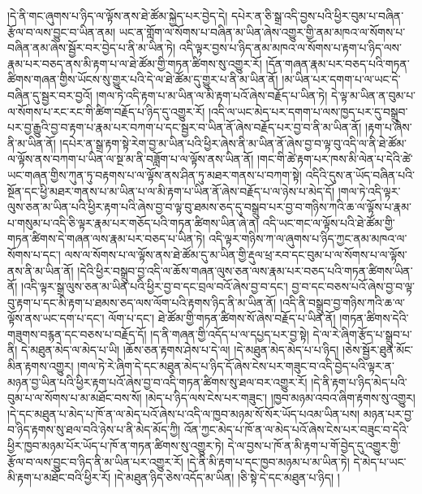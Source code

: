 །དེ་ནི་གང་ཞུགས་པ་ཉིད་ལ་ལྟོས་ནས་ཐེ་ཚོམ་སྐྱེད་པར་བྱེད་དེ། དཔེར་ན་ཅི་སྒྲ་འདི་བྱས་པའི་ཕྱིར་བུམ་པ་བཞིན་རྩོལ་བ་ལས་བྱུང་བ་ཡིན་ནམ། ཡང་ན་གློག་ལ་སོགས་པ་བཞིན་མ་ཡིན་ཞེས་འགྱུར་གྱི་ནམ་མཁའ་ལ་སོགས་པ་བཞིན་ནམ་ཞེས་སྦྱོར་བར་བྱེད་པ་ནི་མ་ཡིན་ཏེ། འདི་ལྟར་བྱས་པ་ཉིད་ནམ་མཁའ་ལ་སོགས་པ་རྟག་པ་ཉིད་ལས་རྣམ་པར་བཅད་ནས་མི་རྟག་པ་ལ་ཐེ་ཚོམ་གྱི་གཏན་ཚིགས་སུ་འགྱུར་རོ། །དོན་གཞན་རྣམ་པར་བཅད་པའི་གཏན་ཚིགས་གཞན་གྱིས་ཡོངས་སུ་གྱུར་པའི་དེ་ལ་ཐེ་ཚོམ་དུ་གྱུར་པ་ནི་མ་ཡིན་ནོ། །མ་ཡིན་པར་དགག་པ་ལ་ཡང་དེ་བཞིན་དུ་སྦྱར་བར་བྱའོ། །གལ་ཏེ་འདི་རྟག་པ་མ་ཡིན་ལ་མི་རྟག་པའོ་ཞེས་བརྗོད་པ་ཡིན་ཏེ། དེ་ལྟ་མ་ཡིན་ན་བུམ་པ་ལ་སོགས་པ་རང་རང་གི་ཚིག་བརྗོད་པ་ཉིད་དུ་འགྱུར་རོ། །འདི་ལ་ཡང་མེད་པར་དགག་པ་ལས་ཁྱད་པར་དུ་བསྒྲུབ་པར་བྱ་རྒྱུའི་བྱ་བ་རྟག་པ་རྣམ་པར་བཀག་པ་དང་སྦྱར་བ་ཡིན་ནོ་ཞེས་བརྗོད་པར་བྱ་བ་ནི་མ་ཡིན་ནོ། །རྟག་པ་ཞེས་ནི་མ་ཡིན་ནོ། །དཔེར་ན་སྒྲ་རྟག་སྟེ་རེག་བྱ་མ་ཡིན་པའི་ཕྱིར་ཞེས་ནི་མ་ཡིན་ནོ་ཞེས་བྱ་བ་ལྟ་བུ་འདི་ལ་ནི་ཐེ་ཚོམ་ལ་ལྟོས་ནས་བཀག་པ་ཡིན་ལ་སྔ་མ་ནི་བཟློག་པ་ལ་ལྟོས་ནས་ཡིན་ནོ། །གང་གི་ཚེ་རྟག་པར་ཁས་མི་ལེན་པ་དེའི་ཚེ་ཡང་གཞན་གྱིས་ཀུན་ཏུ་བརྟགས་པ་ལ་ལྟོས་ནས་ཤིན་ཏུ་མཐར་གནས་པ་བཀག་སྟེ། འདིའི་དུས་ན་ཡོད་བཞིན་པའི་སྔོན་དང་ཕྱི་མཐར་གནས་པ་མ་ཡིན་པ་ལ་མི་རྟག་པ་ཡིན་ནོ་ཞེས་བརྗོད་པ་ལ་ཉེས་པ་མེད་དོ། །གལ་ཏེ་འདི་ལྟར་ལུས་ཅན་མ་ཡིན་པའི་ཕྱིར་རྟག་པའི་ཞེས་བྱ་བ་ལྟ་བུ་ཐམས་ཅད་དུ་བསྒྲུབ་པར་བྱ་བ་གཉིས་ཀའི་ཆ་ལ་ལྟོས་པ་རྣམ་པ་གསུམ་པ་འདི་ཅི་ལྟར་རྣམ་པར་གཅོད་པའི་གཏན་ཚིགས་ཡིན་ཞེ་ན། འདི་ཡང་གང་ལ་ལྟོས་པའི་ཐེ་ཚོམ་གྱི་གཏན་ཚིགས་དེ་གཞན་ལས་རྣམ་པར་བཅད་པ་ཡིན་ཏེ། འདི་ལྟར་གཉིས་ཀ་ལ་ཞུགས་པ་ཉིད་ཀྱང་ནམ་མཁའ་ལ་སོགས་པ་དང་། ལས་ལ་སོགས་པ་ལ་ལྟོས་ནས་ཐེ་ཚོམ་དུ་མ་ཡིན་གྱི་རྡུལ་ཕྲ་རབ་དང་བུམ་པ་ལ་སོགས་པ་ལ་ལྟོས་ནས་ནི་མ་ཡིན་ནོ། །དེའི་ཕྱིར་བསྒྲུབ་བྱ་འདི་ལ་ཆོས་གཞན་ལུས་ཅན་ལས་རྣམ་པར་བཅད་པའི་གཏན་ཚིགས་ཡིན་ནོ། །འདི་ལྟར་སྒྲ་ལུས་ཅན་མ་ཡིན་པའི་ཕྱིར་བྱ་བ་དང་བྲལ་བའོ་ཞེས་བྱ་བ་དང་། བྱ་བ་དང་བཅས་པའོ་ཞེས་བྱ་བ་ལྟ་བུ་རྟག་པ་དང་མི་རྟག་པ་ཐམས་ཅད་ལས་ལོག་པའི་རྟགས་ཉིད་ནི་མ་ཡིན་ནོ། །འདི་ནི་བསྒྲུབ་བྱ་གཉིས་ཀའི་ཆ་ལ་ལྟོས་ནས་ཡང་དག་པ་དང་། ལོག་པ་དང་། ཐེ་ཚོམ་གྱི་གཏན་ཚིགས་སོ་ཞེས་བརྗོད་པ་ཡིན་ནོ། །གཏན་ཚིགས་དེའི་གཟུགས་བརྙན་དང་བཅས་པ་བརྗོད་དོ། །ད་ནི་གཞན་གྱི་འདོད་པ་ལ་དཔྱད་པར་བྱ་སྟེ། དེ་ལ་རེ་ཞིག་རྩོད་པ་སྒྲུབ་པ་ནི། དེ་མཐུན་མེད་ལ་མེད་པ་ཡི། །ཆོས་ཅན་རྟགས་ཤེས་པ་དེ་ལ། །དེ་མཐུན་མེད་མེད་པ་པ་ཉིད། །ཅེས་སྦྱོར་ཐུན་མོང་མིན་རྟགས་འགྱུར། །གལ་ཏེ་རེ་ཞིག་དེ་དང་མཐུན་མེད་པ་ཉིད་དོ་ཞེས་ངེས་པར་གཟུང་བ་འདི་བྱེད་པའི་ལྟར་ན་མཉན་བྱ་ཡིན་པའི་ཕྱིར་རྟག་པའོ་ཞེས་བྱ་བ་འདི་གཏན་ཚིགས་སུ་ཐལ་བར་འགྱུར་རོ། །དེ་ནི་རྟག་པ་ཉིད་མེད་པའི་བུམ་པ་ལ་སོགས་པ་མ་མཐོང་བས་སོ། །མེད་པ་ཉིད་ལས་ངེས་པར་གཟུང་། །ཁྱབ་མཉམ་འབའ་ཞིག་རྟགས་སུ་འགྱུར། །དེ་དང་མཐུན་པ་མེད་པ་ཁོ་ན་ལ་མེད་པའོ་ཞེས་པ་འདི་ལ་ཁྱབ་མཉམ་སོ་སོར་ཡོད་པའམ་ཡིན་པས། མཉན་པར་བྱ་བ་ཉིད་རྟགས་སུ་ཐལ་བའི་ཉེས་པ་ནི་མེད་མོད་ཀྱི། འོན་ཀྱང་མེད་པ་ཁོ་ན་ལ་མེད་པའོ་ཞེས་ངེས་པར་བཟུང་བ་དེའི་ཕྱིར་ཁྱབ་མཉམ་པོར་ཡོད་པ་ཁོ་ན་གཏན་ཚིགས་སུ་འགྱུར་ཏེ། དེ་ལ་བྱས་པ་ཁོ་ན་མི་རྟག་པ་གོ་བྱེད་དུ་འགྱུར་གྱི་རྩོལ་བ་ལས་བྱུང་བ་ཉིད་ནི་མ་ཡིན་པར་འགྱུར་རོ། །དེ་ནི་མི་རྟག་པ་དང་ཁྱབ་མཉམ་པ་མ་ཡིན་ཏེ། དེ་མེད་པ་ཡང་མི་རྟག་པ་མཐོང་བའི་ཕྱིར་རོ། །དེ་མཐུན་ཉིད་ཅེས་འདོད་མ་ཡིན། །ཅི་སྟེ་དེ་དང་མཐུན་པ་ཉིད། །
